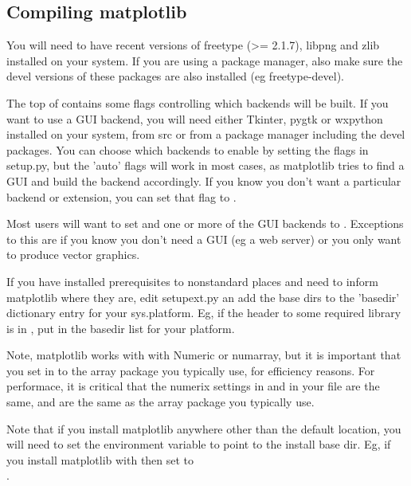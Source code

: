 \documentclass[]{book}
\begin{document}
\subsection{Compiling matplotlib}
\label{sec:compilng}


You will need to have recent versions of freetype (>= 2.1.7), libpng
and zlib installed on your system.  If you are using a package
manager, also make sure the devel versions of these packages are also
installed (eg freetype-devel).
  
The top of  contains some flags controlling which
backends will be built.  If you want to use a GUI backend, you will
need either Tkinter, pygtk or wxpython installed on your system, from
src or from a package manager including the devel packages.  You can
choose which backends to enable by setting the flags in setup.py, but
the 'auto' flags will work in most cases, as matplotlib tries to find
a GUI and build the backend accordingly.  If you know you don't want a
particular backend or extension, you can set that flag to .
  
Most users will want to set  and one or more of
the GUI backends to .  Exceptions to this are if you know
you don't need a GUI (eg a web server) or you only want to produce
vector graphics.
  
If you have installed prerequisites to nonstandard places and need to
inform matplotlib where they are, edit setupext.py an add the base
dirs to the 'basedir' dictionary entry for your sys.platform.  Eg, if
the header to some required library is in
, put  in the
basedir list for your platform.
  
Note, matplotlib works with with Numeric or numarray, but it is
important that you set  in  to the array
package you typically use, for efficiency reasons.  For performace, it
is critical that the numerix settings in  and in your
 file are the same, and are the same as the array
package you typically use.
  
Note that if you install matplotlib anywhere other than the default
location, you will need to set the  environment
variable to point to the install base dir.  Eg, if you install
matplotlib with 
then set  to\\
.
 
\end{document}
